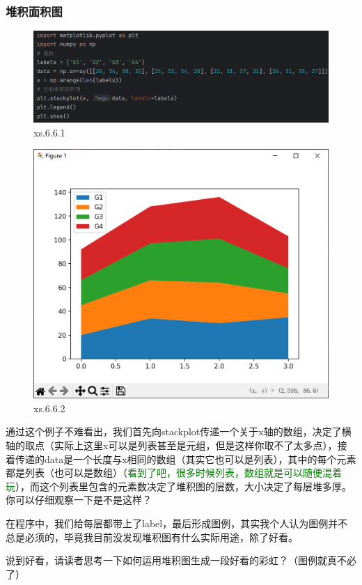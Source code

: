 \documentclass[12pt]{article}
\begin{document}
\subsubsection{堆积面积图}
\begin{figure}[H]
    \centering
    \includegraphics[width=1\linewidth]{堆积面积图 program1.png}
    \caption{xs.6.6.1}
    \label{fig:enter-label}
\end{figure}
\begin{figure}[H]
    \centering
    \includegraphics[width=0.65\linewidth]{堆积面积图 Pic1.png}
    \caption{xs.6.6.2}
    \label{fig:enter-label}
\end{figure}
通过这个例子不难看出，我们首先向stackplot传递一个关于x轴的数组，决定了横轴的取点（实际上这里x可以是列表甚至是元组，但是这样你取不了太多点），接着传递的data是一个长度与x相同的数组（其实它也可以是列表），其中的每个元素都是列表（也可以是数组）（\textcolor{green}{看到了吧，很多时候列表，数组就是可以随便混着玩}），而这个列表里包含的元素数决定了堆积图的层数，大小决定了每层堆多厚。你可以仔细观察一下是不是这样？

在程序中，我们给每层都带上了label，最后形成图例，其实我个人认为图例并不总是必须的，毕竟我目前没发现堆积图有什么实际用途，除了好看。

说到好看，请读者思考一下如何运用堆积图生成一段好看的彩虹？（图例就真不必了）
\end{document}
